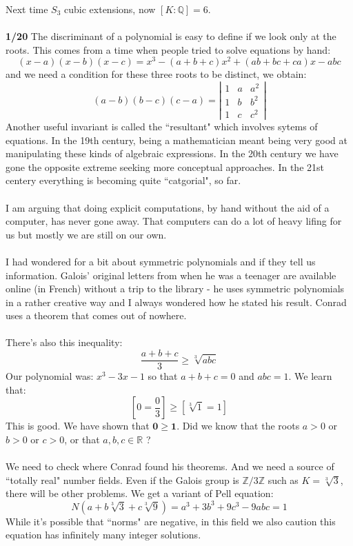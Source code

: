 \documentclass[12pt]{article}
\begin{document}
\noindent Next time $S_3$ cubic extensions, now $[K:\mathbb{Q}]= 6$. \\ \\
\textbf{1/20} The discriminant of a polynomial is easy to define if we look only at the roots.  This comes from a time when people tried to solve equations by hand:
$$  (x- a)(x - b)(x-c)
= x^3 - (a+b+c)x^2 + (ab+bc+ca)x - abc$$
and we need a condition for these three roots to be distinct, we obtain:
$$ (a-b)(b-c)(c-a) = \left|
\begin{array}{ccc} 
1 & a & a^2 \\
1 & b & b^2 \\
1 & c & c^2 \end{array} \right| $$
Another useful invariant is called the ``resultant" which involves sytems of equations.  In the 19th century, being a mathematician meant being very good at manipulating these kinds of algebraic expressions.  In the 20th century we have gone the opposite extreme seeking more conceptual approaches.  In the 21st centery everything is becoming quite ``catgorial", so far. \\ \\
I am arguing that doing explicit computations, by hand without the aid of a computer, has never gone away.  That computers can do a lot of heavy lifing for us but mostly we are still on our own. \\ \\
I had wondered for a bit about symmetric polynomials and if they tell us information.  Galois' original letters from when he was a teenager are available online (in French) without a trip to the library - he uses symmetric polynomials in a rather creative way and I always wondered how he stated his result. Conrad uses a theorem  that comes out of nowhere. \\ \\
There's also this inequality:
$$  \frac{a+b+c}{3} \geq \sqrt[3]{abc} $$
Our polynomial was: $x^3 - 3x - 1 $ so that $a+b+c = 0$ and $abc = 1$.  We learn that:
$$ \left[ 0= \frac{0}{3} \right] \geq \left[ \sqrt[3]{1} = 1 \right] $$
This is good.  We have shown that $\mathbf{0 \geq 1}$. Did we know that the roots $a> 0$ or $b > 0$ or $c > 0$, or that $a,b,c \in \mathbb{R}$ ? \\  \\
We need to check where Conrad found his theorems. And we need a source of ``totally real" number fields.  Even if the Galois group is $\mathbb{Z}/3\mathbb{Z}$ such as $K = \sqrt[3]{3}$, there will be other problems.  We get a variant of Pell equation:
$$ N(a + b\sqrt[3]{3} + c\sqrt[3]{9})
= a^3 + 3b^3 + 9 c^3 - 9abc = 1 $$
While it's possible that ``norms" are negative, in this field we also caution this equation has infinitely many integer solutions.
\newpage
\end{document}

